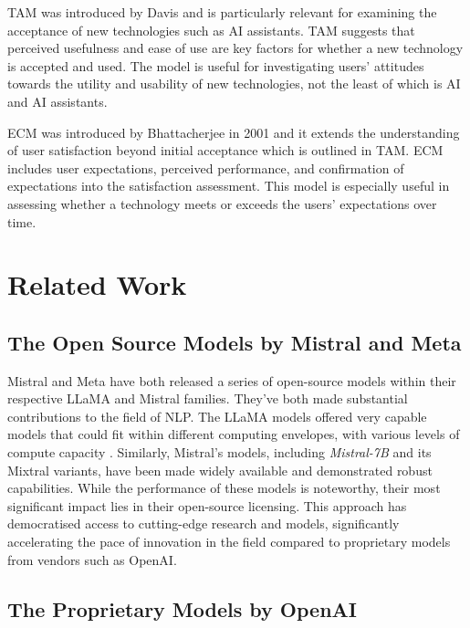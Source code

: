 \gls{TAM} was introduced by Davis \cite{davis_perceived_1989} and is particularly relevant for examining the acceptance of new technologies such as AI assistants. \gls{TAM} suggests that perceived usefulness and ease of use are key factors for whether a new technology is accepted and used. The model is useful for investigating users' attitudes towards the utility and usability of new technologies, not the least of which is AI and AI assistants.


\gls{ECM} was introduced by Bhattacherjee \cite{bhattacherjee_understanding_2001} in 2001 and it extends the understanding of user satisfaction beyond initial acceptance which is outlined in \gls{TAM}. \gls{ECM} includes user expectations, perceived performance, and confirmation of expectations into the satisfaction assessment. This model is especially useful in assessing whether a technology meets or exceeds the users' expectations over time.


\section{Related Work}
\label{sec:related_work}


\subsection{The Open Source Models by Mistral and Meta}


Mistral and Meta have both released a series of open-source models within their respective LLaMA and Mistral families. They’ve both made substantial contributions to the field of \gls{NLP}. The LLaMA models offered very capable models that could fit within different computing envelopes, with various levels of compute capacity \cite{touvron_llama_2023-1, touvron_llama_2023-2}. Similarly, Mistral's models, including \textit{Mistral-7B} and its Mixtral variants, have been made widely available and demonstrated robust capabilities. While the performance of these models is noteworthy, their most significant impact lies in their open-source licensing. This approach has democratised access to cutting-edge research and models, significantly accelerating the pace of innovation in the field compared to proprietary models from vendors such as OpenAI.


\subsection{The Proprietary Models by OpenAI}


